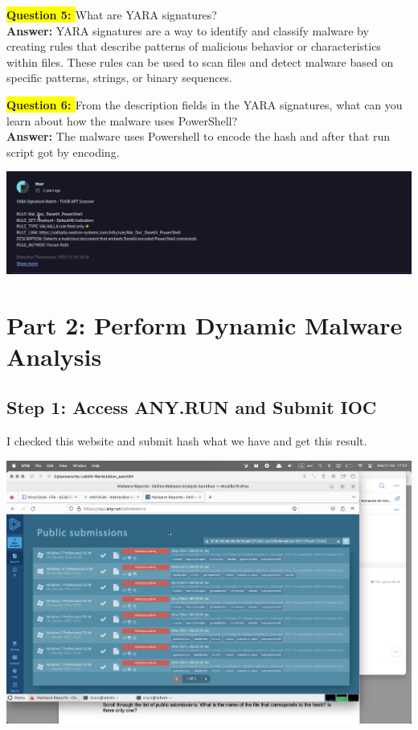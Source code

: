\documentclass{article}
\begin{document}
\newpage

\textbf{\colorbox{yellow}{Question 5: }} What are YARA signatures? \\
\textbf{Answer: } YARA signatures are a way to identify and classify malware by creating rules that describe patterns of malicious behavior or characteristics within files. These rules can be used to scan files and detect malware based on specific patterns, strings, or binary sequences.

\vspace{1\baselineskip}

\textbf{\colorbox{yellow}{Question 6: }} From the description fields in the YARA signatures, what can you learn about how the malware uses PowerShell? \\
\textbf{Answer: } The malware uses Powershell to encode the hash and after that run script got by encoding.

\vspace{2\baselineskip}

\includegraphics[width=1\textwidth]{6.png}

\newpage

\section*{Part 2: Perform Dynamic Malware Analysis}

\subsection*{Step 1: Access ANY.RUN and Submit IOC}

I checked this website and submit hash what we have and get this result.

\vspace{1\baselineskip}
\includegraphics[width=1\textwidth]{7.png}
\end{document}
